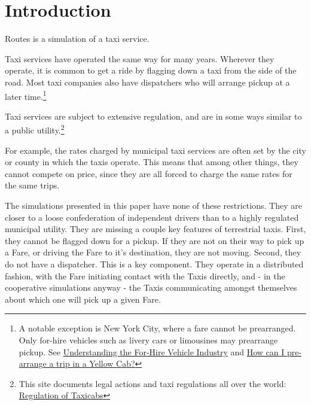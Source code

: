 \documentclass[11pt,letterpaper,onecolumn,twoside,openright,final]{report}
\begin{document}
\setcounter{page}{2}
\onehalfspacing

\chapter{Introduction}

Routes is a simulation of a taxi service.

Taxi services have operated the same way for many years.
Wherever they operate, it is common to get a ride by flagging down a taxi from the side of the road.
Most taxi companies also have dispatchers who will arrange pickup at a later time.\footnote{A notable exception is New York City, where a fare cannot be prearranged.
Only for-hire vehicles such as livery cars or limousines may prearrange pickup.
See \href{http://www.nyc.gov/html/tlc/downloads/pdf/fhv\_base\_fact\_sheet.pdf}{Understanding the For-Hire Vehicle Industry}
and \href{http://www.nyc.gov/html/tlc/html/passenger/faq\_pass.shtml\#14}{How can I pre-arrange a trip in a Yellow Cab?}}

Taxi services are subject to extensive regulation, and are in some ways similar to a public utility.\footnote{This site documents legal actions and taxi regulations all over the world: {\href{http://www.taxi-library.org/regulation.htm}{Regulation of Taxicabs}}}

For example, the rates charged by municipal taxi services are often set by the city or county in which the taxis operate.
This means that among other things, they cannot compete on price, since they are all forced to charge the same rates for the same trips.

The simulations presented in this paper have none of these restrictions.
They are closer to a loose confederation of independent drivers than to a highly regulated municipal utility.
They are missing a couple key features of terrestrial taxis.
First, they cannot be flagged down for a pickup.
If they are not on their way to pick up a Fare, or driving the Fare to it's destination, they are not moving.
Second, they do not have a dispatcher.
This is a key component.
They operate in a distributed fashion, with the Fare initiating contact with the Taxis directly, and - in the cooperative simulations anyway - the Taxis communicating amongst themselves about which one will pick up a given Fare.
\end{document}
